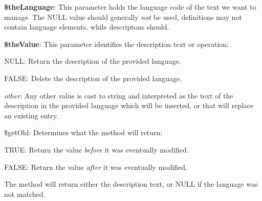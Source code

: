 \begin{DoxyItemize}
\item {\bfseries \$the\-Language}\-: This parameter holds the language code of the text we want to manage. The {\ttfamily N\-U\-L\-L} value should generally {\itshape not} be used, definitions may not contain language elements, while descriptons should. 
\item {\bfseries \$the\-Value}\-: This parameter identifies the description text or operation\-: 
\begin{DoxyItemize}
\item {\ttfamily N\-U\-L\-L}\-: Return the description of the provided language. 
\item {\ttfamily F\-A\-L\-S\-E}\-: Delete the description of the provided language. 
\item {\itshape other}\-: Any other value is cast to string and interpreted as the text of the description in the provided language which will be inserted, or that will replace an existing entry. 
\end{DoxyItemize}
\item {\ttfamily \$get\-Old}\-: Determines what the method will return\-: 
\begin{DoxyItemize}
\item {\ttfamily T\-R\-U\-E}\-: Return the value {\itshape before} it was eventually modified. 
\item {\ttfamily F\-A\-L\-S\-E}\-: Return the value {\itshape after} it was eventually modified. 
\end{DoxyItemize}
\end{DoxyItemize}

The method will return either the description text, or {\ttfamily N\-U\-L\-L} if the language was not matched.



